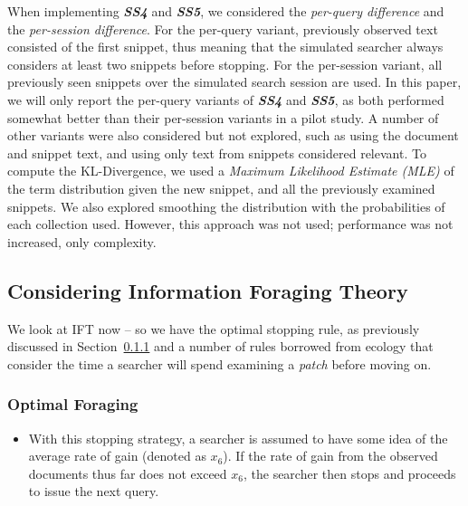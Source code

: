 When implementing \textbf{\emph{SS4}} and \textbf{\emph{SS5}}, we considered the \emph{per-query difference} and the \emph{per-session difference}. For the per-query variant, previously observed text consisted of the first snippet, thus meaning that the simulated searcher always considers at least two snippets before stopping. For the per-session variant, all previously seen snippets over the simulated search session are used. In this paper, we will only report the per-query variants of \textbf{\emph{SS4}} and \textbf{\emph{SS5}}, as both performed somewhat better than their per-session variants in a pilot study. A number of other variants were also considered but not explored, such as using the document and snippet text, and using only text from snippets considered relevant. To compute the KL-Divergence, we used a \emph{Maximum Likelihood Estimate (MLE)} of the term distribution given the new snippet, and all the previously examined snippets. We also explored smoothing the distribution with the probabilities of each collection used. However, this approach was not used; performance was not increased, only complexity.

\subsection{Considering Information Foraging Theory}
We look at IFT now -- so we have the optimal stopping rule, as previously discussed in Section~\ref{} and a number of rules borrowed from ecology that consider the time a searcher will spend examining a \emph{patch} before moving on.

\subsubsection{Optimal Foraging}

\begin{itemize}
    \item[\blueboxbold{SS8}] With this stopping strategy, a searcher is assumed to have some idea of the average rate of gain (denoted as $x_6$). If the rate of gain from the observed documents thus far does not exceed $x_6$, the searcher then stops and proceeds to issue the next query.
\end{itemize}

